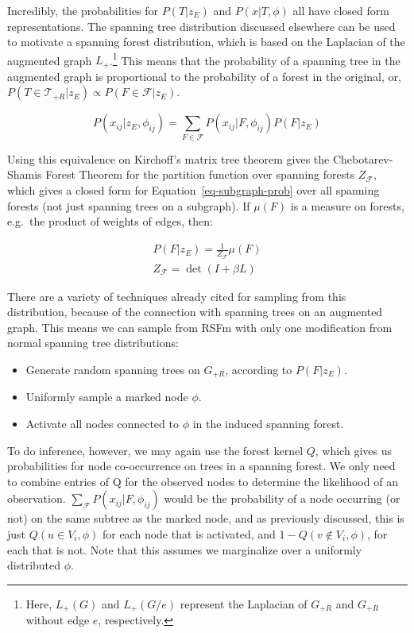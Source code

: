 \documentclass[%
	12pt,
		oneside,
		letterpaper
]{book}
\providecommand{\tightlist}{%
  \setlength{\itemsep}{0pt}\setlength{\parskip}{0pt}}\usepackage{longtable,booktabs,array}
\begin{document}
Incredibly, the probabilities for \(P(T|z_E)\) and \(P(x|T,\phi)\) all have closed form representations.
The spanning tree distribution discussed elsewhere\autocite{BayesianSpanningTree_Duan2021,EfficientComputationExpectations_Zmigrod2021} can be used to motivate a spanning forest distribution, which is based on the Laplacian of the augmented graph \(L_+\).\footnote{Here, \(L_+(G)\) and \(L_+(G/e)\) represent the Laplacian of \(G_{+R}\) and \(G_{+R}\) without edge \(e\), respectively.}
This means that the probability of a spanning tree in the augmented graph is proportional to the probability of a forest in the original, or, \(P(T\in\mathcal{T}_{+R}|z_E) \propto P(F\in\mathcal{F}|z_E)\).

\[
P(x_{ij}|z_E, \phi_{ij}) = \sum_{F\in\mathcal{F}}P(x_{ij}| F,\phi_{ij}) P(F|z_E)
\]

Using this equivalence on Kirchoff's matrix tree theorem gives the Chebotarev-Shamis Forest Theorem\autocite{MatrixForestTheorem_Chebotarev2006} for the partition function over spanning forests \(Z_\mathcal{F}\), which gives a closed form for Equation~\ref{eq-subgraph-prob} over all spanning forests (not just spanning trees on a subgraph).
If \(\mu(F)\) is a measure on forests, e.g.~the product of weights of edges, then:

\[
\begin{gathered}
P(F|z_E) = \frac{1}{Z_\mathcal{F}} \mu(F)\\
Z_\mathcal{F} = \det{(I+\beta L)}
\end{gathered}
\]

There are a variety of techniques already cited for sampling from this distribution, because of the connection with spanning trees on an augmented graph.
This means we can sample from RSFm with only one modification from normal spanning tree distributions:

\begin{itemize}
\tightlist
\item
  Generate random spanning trees on \(G_{+R}\), according to \(P(F|z_E)\).
\item
  Uniformly sample a marked node \(\phi\).
\item
  Activate all nodes connected to \(\phi\) in the induced spanning forest.
\end{itemize}

To do inference, however, we may again use the forest kernel \(Q\), which gives us probabilities for node co-occurrence on trees in a spanning forest.
We only need to combine entries of Q for the observed nodes to determine the likelihood of an observation.
\(\sum_\mathcal{F} P(x_{ij}|F,\phi_{ij})\) would be the probability of a node occurring (or not) on the same subtree as the marked node, and as previously discussed, this is just \(Q(u\in V_i,\phi)\) for each node that is activated, and \(1-Q(v\notin V_i,\phi)\), for each that is not.
Note that this assumes we marginalize over a uniformly distributed \(\phi\).
\end{document}
